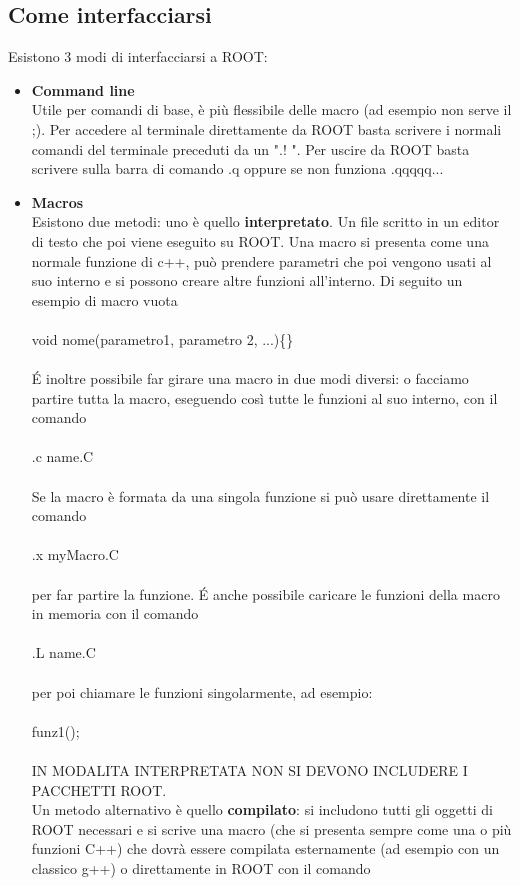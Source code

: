 \documentclass[10pt,a4paper]{article}
\begin{document}
\subsection{Come interfacciarsi}
Esistono 3 modi di interfacciarsi a ROOT: 
\begin{itemize}
\item \textbf{Command line}\\
Utile per comandi di base, è più flessibile delle macro (ad esempio non serve il ;). Per accedere al terminale direttamente da ROOT basta scrivere i normali comandi del terminale preceduti da un ".! ". Per uscire da ROOT basta scrivere sulla barra di comando .q oppure se non funziona .qqqqq...
\item \textbf{Macros}\\
Esistono due metodi: uno è quello \textbf{interpretato}. Un file scritto in un editor di testo che poi viene eseguito su ROOT. Una macro si presenta come una normale funzione di c++, può prendere parametri che poi vengono usati al suo interno e si possono creare altre funzioni all'interno. Di seguito un esempio di macro vuota\\\\
void nome(parametro1, parametro 2, ...)\{\}\\\\
\'{E} inoltre possibile far girare una macro in due modi diversi: o facciamo partire tutta la macro, eseguendo così tutte le funzioni al suo interno, con il comando\\\\
.c name.C\\\\
Se la macro è formata da una singola funzione si può usare direttamente il comando\\\\
.x myMacro.C\\\\
per far partire la funzione.
\'E anche possibile caricare le funzioni della macro in memoria con il comando\\\\
.L name.C\\\\
per poi chiamare le funzioni singolarmente, ad esempio:\\\\
funz1();\\\\
IN MODALITA INTERPRETATA NON SI DEVONO INCLUDERE I PACCHETTI ROOT.\\
Un metodo alternativo è quello \textbf{compilato}: si includono tutti gli oggetti di ROOT necessari e si scrive una macro (che si presenta sempre come una o più funzioni C++) che dovrà essere compilata esternamente (ad esempio con un classico g++) o direttamente in ROOT con il comando \\\\

\end{itemize}
\end{document}

